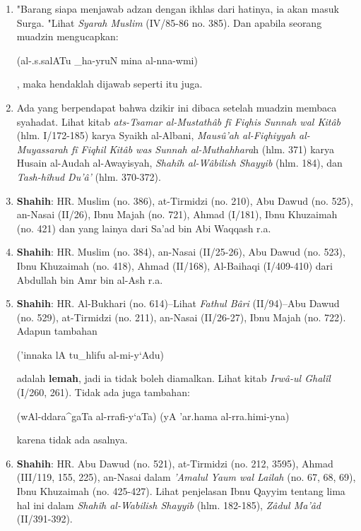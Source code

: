 \documentclass[a4paper,12pt]{article}
\begin{document}
\begin{enumerate}
\item "Barang siapa menjawab adzan dengan ikhlas dari hatinya, ia akan 
masuk Surga. "Lihat \textit{Syarah Muslim} (IV/85-86 no. 385). Dan apabila 
seorang muadzin mengucapkan: \begin{arabtext} (al-.s.salATu _ha-yruN mina 
al-nna-wmi) \end{arabtext}, maka hendaklah dijawab seperti itu juga.
\item Ada yang berpendapat bahwa dzikir ini dibaca setelah muadzin membaca 
syahadat. Lihat kitab \textit{ats-Tsamar al-Mustath\^{a}b f\^{i} Fiqhis 
Sunnah wal Kit\^{a}b} (hlm. I/172-185) karya Syaikh al-Albani, 
\textit{Maus\^{u}'ah al-Fiqhiyyah al-Muyassarah f\^{i} Fiqhil Kit\^{a}b was
Sunnah al-Muthahhara}h (hlm. 371) karya Husain al-Audah al-Awayisyah, 
\textit{Shah\^{i}h al-W\^{a}bilish Shayyib} (hlm. 184), dan 
\textit{Tash-h\^{i}hud Du'\^{a}'} (hlm. 370-372).
\item \textbf{Shahih}: HR. Muslim (no. 386), at-Tirmidzi (no. 210), Abu 
Dawud (no. 525), an-Nasai (II/26), Ibnu Majah (no. 721), Ahmad (I/181), 
Ibnu Khuzaimah (no. 421) dan yang lainya dari Sa'ad bin Abi Waqqash r.a.
\item \textbf{Shahih}: HR. Muslim (no. 384), an-Nasai (II/25-26), Abu Dawud
(no. 523), Ibnu Khuzaimah (no. 418), Ahmad (II/168), Al-Baihaqi (I/409-410)
dari Abdullah bin Amr bin al-Ash r.a.
\item \textbf{Shahih}: HR. Al-Bukhari (no. 614)--Lihat 
\textit{Fathul B\^{a}ri} (II/94)--Abu Dawud (no. 529), at-Tirmidzi (no. 
211), an-Nasai (II/26-27), Ibnu Majah (no. 722). Adapun tambahan 
\begin{arabtext} ('innaka lA tu_hlifu al-mi-y`Adu) \end{arabtext} adalah 
\textbf{lemah}, jadi ia tidak boleh diamalkan. Lihat kitab 
\textit{Irw\^{a}-ul Ghal\^{i}l} (I/260, 261). Tidak ada juga tambahan: 
\begin{arabtext} (wAl-ddara^gaTa al-rrafi-y`aTa) (yA 'ar.hama 
al-rra.himi-yna) \end{arabtext} karena tidak ada asalnya.
\item \textbf{Shahih}: HR. Abu Dawud (no. 521), at-Tirmidzi (no. 212, 
3595), Ahmad (III/119, 155, 225), an-Nasai dalam \textit{'Amalul Yaum wal 
Lailah} (no. 67, 68, 69), Ibnu Khuzaimah (no. 425-427). Lihat penjelasan 
Ibnu Qayyim tentang lima hal ini dalam \textit{Shah\^{i}h al-Wabilish 
Shayyib} (hlm. 182-185), \textit{Z\^{a}dul Ma'\^{a}d} (II/391-392).\\\\
\end{enumerate}
\end{document}
